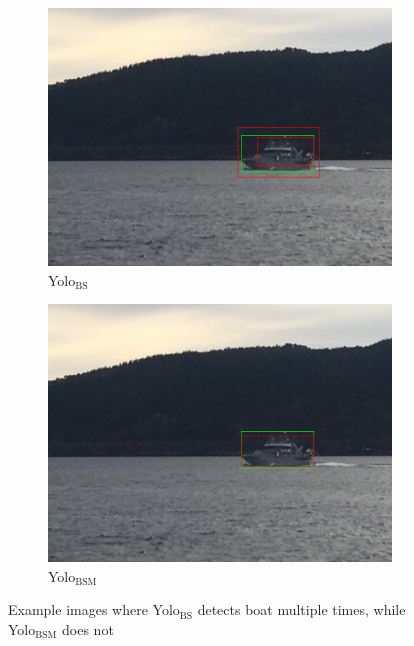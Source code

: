 \begin{figure}[h!]
\begin{subfigure}{.5\textwidth}
  \centering
  \includegraphics[width=0.8\linewidth]{results/case_tr_moor/yolo12/yolo1/2better/IMG_2269.jpg}
  \caption{Yolo$_{\text{BS}}$}
\end{subfigure}%
\begin{subfigure}{.5\textwidth}
  \centering
  \includegraphics[width=.8\linewidth]{results/case_tr_moor/yolo12/yolo2/2better/IMG_2269.jpg}
  \caption{Yolo$_{\text{BSM}}$}
\end{subfigure}
\caption{Example images where Yolo$_{\text{BS}}$ detects boat multiple times, while Yolo$_{\text{BSM}}$ does not}
\label{img:yolo1_multi_detect}
\end{figure}
